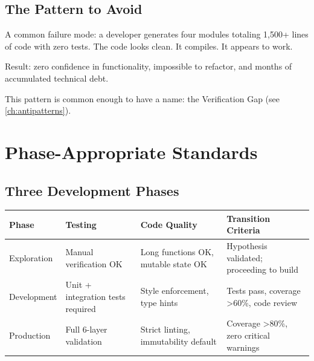 
\subsection{The Pattern to Avoid}

\begin{warnbox}
A common failure mode: a developer generates four modules totaling 1,500+
lines of code with zero tests. The code looks clean. It compiles. It appears to work.

Result: zero confidence in functionality, impossible to refactor,
and months of accumulated technical debt.

This pattern is common enough to have a name: the Verification Gap
(see \cref{ch:antipatterns}).
\end{warnbox}

\section{Phase-Appropriate Standards}
\label{sec:phases}


\subsection{Three Development Phases}

\begin{fullwidth}
\begin{tabular}{@{}lp{3cm}p{3cm}p{4cm}@{}}
\toprule
\textbf{Phase} & \textbf{Testing} & \textbf{Code Quality} & \textbf{Transition Criteria} \\
\midrule
Exploration & Manual verification OK & Long functions OK, mutable state OK & Hypothesis validated; proceeding to build \\
Development & Unit + integration tests required & Style enforcement, type hints & Tests pass, coverage >60\%, code review \\
Production & Full 6-layer validation & Strict linting, immutability default & Coverage >80\%, zero critical warnings \\
\bottomrule
\end{tabular}
\end{fullwidth}

